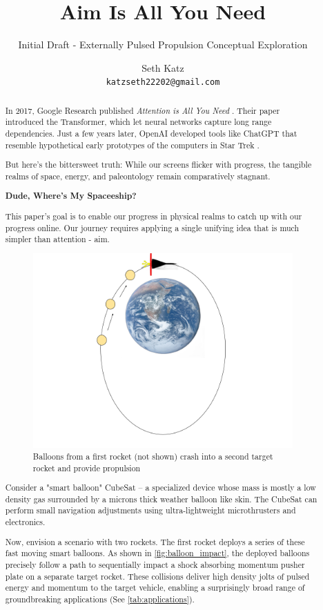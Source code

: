 \documentclass{article}
\title{Aim Is All You Need}
\subtitle{Initial Draft - Externally Pulsed Propulsion Conceptual Exploration}
\author{
  Seth Katz \\
  \texttt{katzseth22202@gmail.com} \\
}
\begin{document}
\maketitle
\newpage
\tableofcontents
\newpage

\begin{abstract}\label{sec:abstract}
 
In 2017, Google Research published \textit{Attention is All You Need} \cite{vaswani2023attentionneed}.  Their paper introduced the Transformer, which let neural networks capture long range dependencies.   Just a few years later, OpenAI developed tools like ChatGPT \cite{chatgpt} that resemble hypothetical early prototypes of the computers in Star Trek \cite{startrek}.

But here's the bittersweet truth:  While our screens flicker with progress, the tangible realms of space, energy, and paleontology remain comparatively stagnant.

\textbf{Dude, Where's My Spaceeship?}

This paper's goal is to enable our progress in physical realms to catch up with our progress online.  Our journey requires applying a single unifying idea that is much simpler than attention - aim.   

\begin{figure}[htpb]
    \centering
    \includegraphics[width=0.5\linewidth]{images/Starship_Impact_ellipse.png}
    \caption{Balloons from a first rocket (not shown) crash into a second target rocket and provide propulsion \cite{earth_image}}
    \label{fig:balloon_impact}
\end{figure}

Consider a "smart balloon" CubeSat -- a specialized device whose mass is mostly a low density gas surrounded by a microns thick weather balloon like skin. The CubeSat can perform small navigation adjustments using ultra-lightweight microthrusters and electronics.

Now, envision a scenario with two rockets. The first rocket deploys a series of these fast moving smart balloons. As shown in \autoref{fig:balloon_impact}, the deployed balloons precisely follow a path to sequentially impact a shock absorbing momentum pusher plate on a separate target rocket. These collisions deliver high density jolts of pulsed energy and momentum to the target vehicle, enabling a surprisingly broad range of groundbreaking applications (See \autoref{tab:applications}). 


\end{abstract}
\end{document}
